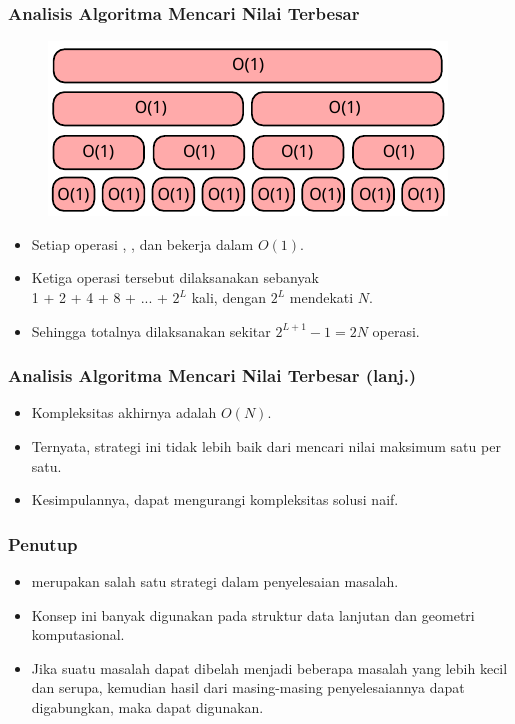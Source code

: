 \begin{frame}
\frametitle{Analisis Algoritma Mencari Nilai Terbesar}
\begin{figure}
  \centering
  \includegraphics[width=8 cm]{asset/find-max-complexity.pdf}
\end{figure}
\begin{itemize}
  \item Setiap operasi , , dan  bekerja dalam $O(1)$.
  \item Ketiga operasi tersebut dilaksanakan sebanyak\\1 + 2 + 4 + 8 + ... + $2^L$ kali, dengan $2^L$ mendekati $N$.
  \item Sehingga totalnya dilaksanakan sekitar $2^{L+1} - 1 = 2N$ operasi.
\end{itemize}
\end{frame}

\begin{frame}
\frametitle{Analisis Algoritma Mencari Nilai Terbesar (lanj.)}
\begin{itemize}
  \item Kompleksitas akhirnya adalah $O(N)$.
  \item Ternyata, strategi ini tidak lebih baik dari mencari nilai maksimum satu per satu.
  \item Kesimpulannya, \fdivideAndConquer {} dapat mengurangi kompleksitas solusi naif.
\end{itemize}
\end{frame}

\begin{frame}
\frametitle{Penutup}
\begin{itemize}
  \item \fDivideAndConquer merupakan salah satu strategi dalam penyelesaian masalah.
  \item Konsep ini banyak digunakan pada struktur data lanjutan dan geometri komputasional.
  \item Jika suatu masalah dapat dibelah menjadi beberapa masalah yang lebih kecil dan serupa, kemudian hasil dari masing-masing penyelesaiannya dapat digabungkan, maka \fdivideAndConquer dapat digunakan.
\end{itemize}
\end{frame}


